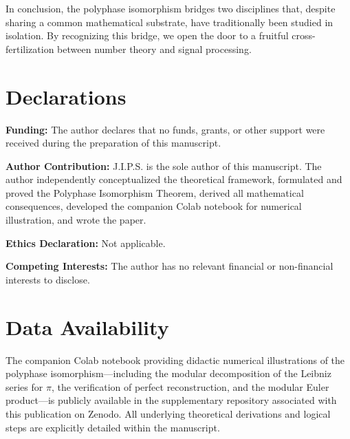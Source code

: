 \documentclass[12pt,a4paper]{article}
\theoremstyle{plain}
\theoremstyle{definition}
\theoremstyle{remark}
\begin{document}
In conclusion, the polyphase isomorphism bridges two disciplines that, despite sharing a common mathematical substrate, have traditionally been studied in isolation. By recognizing this bridge, we open the door to a fruitful cross-fertilization between number theory and signal processing.

\section*{Declarations}

\textbf{Funding:} The author declares that no funds, grants, or other support were received during the preparation of this manuscript.

\vspace{0.5em}
\noindent\textbf{Author Contribution:} J.I.P.S. is the sole author of this manuscript. The author independently conceptualized the theoretical framework, formulated and proved the Polyphase Isomorphism Theorem, derived all mathematical consequences, developed the companion Colab notebook for numerical illustration, and wrote the paper.

\vspace{0.5em}
\noindent\textbf{Ethics Declaration:} Not applicable.

\vspace{0.5em}
\noindent\textbf{Competing Interests:} The author has no relevant financial or non-financial interests to disclose.

\section*{Data Availability}
The companion Colab notebook providing didactic numerical illustrations of the polyphase isomorphism—including the modular decomposition of the Leibniz series for \(\pi\), the verification of perfect reconstruction, and the modular Euler product—is publicly available in the supplementary repository associated with this publication on Zenodo. All underlying theoretical derivations and logical steps are explicitly detailed within the manuscript.
\end{document}
